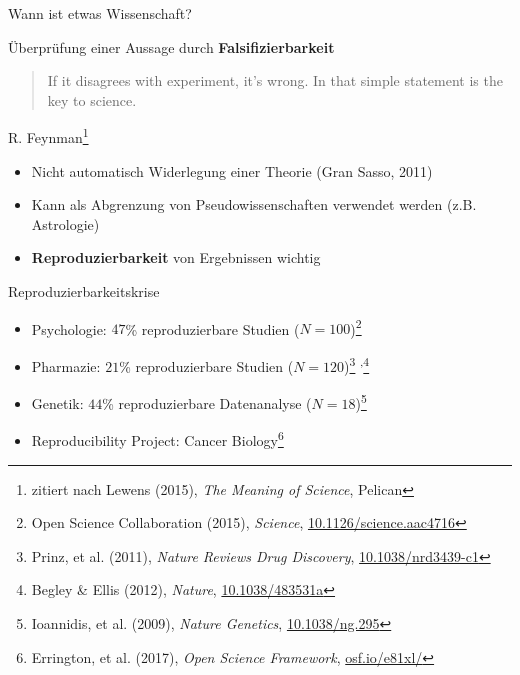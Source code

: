 \documentclass{beamer}
\begin{document}
\begin{frame}{Wann ist etwas Wissenschaft?}

    Überprüfung einer Aussage durch \textbf{Falsifizierbarkeit}
    \begin{quote}
        If it disagrees with experiment, it's wrong. In that simple statement is
        the key to science.
    \end{quote}

    {\ft\hfill R. Feynman\footnote{%
    zitiert nach Lewens (2015), \emph{The Meaning of Science},
    Pelican}\hspace{1cm}}

    \vspace{1cm}

    \begin{itemize}
        \item Nicht automatisch Widerlegung einer Theorie (Gran Sasso, 2011)
        \item Kann als Abgrenzung von Pseudowissenschaften verwendet werden
            (z.B. Astrologie)
        \item \textbf{Reproduzierbarkeit} von Ergebnissen wichtig
    \end{itemize}

\end{frame}

\begin{frame}{Reproduzierbarkeitskrise}

    \begin{itemize}
        \item Psychologie: $47$\% reproduzierbare Studien ($N=100$)\footnote{%
            Open Science Collaboration (2015), \emph{Science},
            \href{https://doi.org/10.1126/science.aac4716}{10.1126/science.aac4716}}
        \item Pharmazie: $21$\% reproduzierbare Studien ($N=120$)\footnote{%
            Prinz, et al. (2011), \emph{Nature Reviews Drug Discovery},
            \href{https://doi.org/10.1038/nrd3439-c1}{10.1038/nrd3439-c1}}%
            \textsuperscript{,}\footnote{%
            Begley \& Ellis (2012), \emph{Nature},
            \href{https://doi.org/10.1038/483531a}{10.1038/483531a}}
        \item Genetik: $44$\% reproduzierbare Datenanalyse ($N=18$)\footnote{%
            Ioannidis, et al. (2009), \emph{Nature Genetics},
            \href{https://doi.org/10.1038/ng.295}{10.1038/ng.295}}
    \end{itemize}

    \begin{itemize}
        \item Reproducibility Project: Cancer Biology\footnote{%
            Errington, et al. (2017), \emph{Open Science Framework},
            \href{https://osf.io/e81xl/}{osf.io/e81xl/}}
    \end{itemize}

\end{frame}
\end{document}
